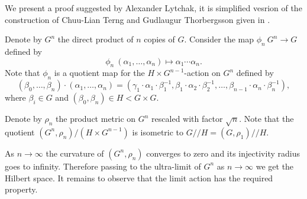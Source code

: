 We present a proof suggested by Alexander Lytchak, it is simplified vesrion of the construction of Chuu-Lian Terng and Gudlaugur Thorbergsson given in \cite[Section 4]{terng-thorbergsson}.


Denote by $G^n$ the direct product of $n$ copies of $G$.
Consider the map $\phi_n\:G^n\to G$ defined by
\[\phi_n\:(\alpha_1,\dots,\alpha_n)\mapsto \alpha_1\cdots\alpha_n.\]
Note that $\phi_n$ is a quotient map for the $H\times G^{n-1}$-action on $G^n$ defined by
\[(\beta_0,\dots,\beta_n)\cdot(\alpha_1,\dots,\alpha_n)=(\gamma_1\cdot \alpha_1\cdot\beta_1^{-1},\beta_1\cdot\alpha_2\cdot\beta_2^{-1},\dots,\beta_{n-1}\cdot\alpha_n\cdot\beta_n^{-1}),\]
where $\beta_i\in G$ and $(\beta_0,\beta_n)\in H<G\times G$. 

Denote by $\rho_n$ the product metric on $G^n$ rescaled with factor $\sqrt{n}$.
Note that the quotient $(G^n,\rho_n)/(H\times G^{n-1})$ is isometric to $G/\!\!/H=(G,\rho_1)/\!\!/H$.

As $n\to\infty$ the curvature of $(G^n,\rho_n)$ converges to zero and its injectivity radius goes to infinity.
Therefore passing to the ultra-limit of $G^n$ as $n\to\infty$ we get the Hilbert space.
It remains to observe that the limit action has the required property.
\qeds